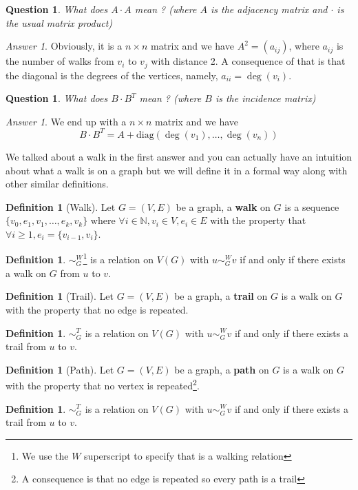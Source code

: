 \documentclass{tufte-handout}
\newcommand{\bra}[1]{\left(#1\right)}
\newtheorem{quest}[thm]{Question}
\theoremstyle{definition}
\newtheorem{defn}[thm]{Definition}
\theoremstyle{remark}
\newtheorem{ans}[thm]{Answer}
\newcommand{\N}{\mathbb{N}}
\begin{document}
\begin{quest}
	What does $A \cdot A$ mean ? (where $A$ is the adjacency matrix and $\cdot$ is the usual matrix product)
\end{quest}
\begin{ans}
	Obviously, it is a $n\times n$ matrix and we have $A^2 = \bra{a_{ij}}$, where $a_{ij}$ is the number of walks from $v_i$ to $v_j$ with distance 2. A consequence of that is that the diagonal is the degrees of the vertices, namely, $a_{ii} = \deg{\bra{v_i}}$.
\end{ans}
\begin{quest}
	What does $B \cdot B^{T}$ mean ? (where $B$ is the incidence matrix)
\end{quest}
\begin{ans}
	We end up with a $n\times n$ matrix and we have $$B\cdot B^{T} = A + \text{diag}\bra{\deg{\bra{v_1}}, \dots, \deg{\bra{v_n}}}$$
\end{ans}

We talked about a walk in the first answer and you can actually have an intuition about what a walk is on a graph but we will define it in a formal way along with other similar definitions.

\begin{defn}[Walk]
	Let $G = (V, E)$ be a graph, a \textbf{walk} on $G$ is a sequence $\{v_0, e_1, v_1, \dots, e_k, v_k\}$ where $\forall i \in \N, v_i \in V, e_i \in E$ with the property that $\forall i \geq 1, e_i = \{v_{i-1}, v_i\}$.
\end{defn}
\begin{defn}
	$\sim_G^W$\footnote{We use the $W$ superscript to specify that is a walking relation} is a relation on $V(G)$ with $u \sim_G^W v$ if and only if there exists a walk on $G$ from $u$ to $v$.
\end{defn}
\begin{defn}[Trail]
	Let $G = (V, E)$ be a graph, a \textbf{trail} on $G$ is a walk on $G$ with the property that no edge is repeated.
\end{defn}
\begin{defn}
	$\sim_G^T$ is a relation on $V(G)$ with $u \sim_G^W v$ if and only if there exists a trail from $u$ to $v$.
\end{defn}
\begin{defn}[Path]
Let $G = (V, E)$ be a graph, a \textbf{path} on $G$ is a walk on $G$ with the property that no vertex is repeated\footnote{A consequence is that no edge is repeated so every path is a trail}.
\end{defn}
\begin{defn}
$\sim_G^T$ is a relation on $V(G)$ with $u \sim_G^W v$ if and only if there exists a trail from $u$ to $v$.
\end{defn}
\end{document}
